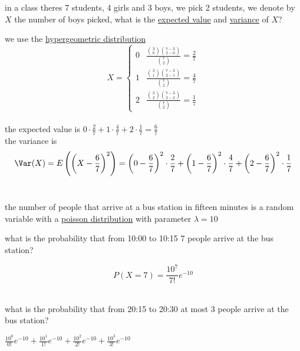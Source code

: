 \documentclass[a4paper,12pt]{article}
\begin{document}
\begin{question}
in a class theres 7 students, 4 girls and 3 boys, we pick 2 students, we denote by \(X\) the number of boys picked, what is the \href{20230121184721-expected_value.org}{expected value} and \href{20230113164748-variance.org}{variance} of \(X\)?\\
\begin{answer}
we use the \href{20230113165622-hypergeometric_distribution.org}{hypergeometric distribution}\\
\[
X = \begin{cases}
      0 & \frac{\binom{3}{0}\binom{7-3}{2-0}}{\binom{7}{2}} = \frac{2}{7}\\
      1 & \frac{\binom{3}{1}\binom{7-3}{2-1}}{\binom{7}{2}} = \frac{4}{7}\\
      2 & \frac{\binom{3}{2}\binom{7-3}{2-2}}{\binom{7}{2}} = \frac{1}{7}
    \end{cases}
\]\\
the expected value is \(0 \cdot \frac{2}{7} + 1 \cdot \frac{4}{7} + 2 \cdot \frac{1}{7} = \frac{6}{7}\)\\
the variance is\\
\[
\Var(X)=E\left(\left(X-\frac{6}{7}\right)^2\right)=\left(0-\frac{6}{7}\right)^2 \cdot \frac{2}{7}+\left(1-\frac{6}{7}\right)^2\cdot\frac{4}{7}+\left(2-\frac{6}{7}\right)^2\cdot\frac{1}{7}
\]\\
\end{answer}
\end{question}
\begin{question}
the number of people that arrive at a bus station in fifteen minutes is a random variable with a \href{20230121204918-poisson_distribution.org}{poisson distribution} with parameter \(\lambda=10\)\\
\begin{subquestion}
what is the probability that from 10:00 to 10:15 7 people arrive at the bus station?\\
\begin{answer}
\[
P(X=7)=\frac{10^7}{7!}e^{-10}
\]\\
\end{answer}
\end{subquestion}
\begin{subquestion}
what is the probability that from 20:15 to 20:30 at most 3 people arrive at the bus station?\\
\begin{answer}
\(\frac{10^0}{0!}e^{-10}+\frac{10^1}{1!}e^{-10}+\frac{10^2}{2!}e^{-10}+\frac{10^3}{3!}e^{-10}\)\\
\end{answer}
\end{subquestion}
\end{question}
\end{document}
